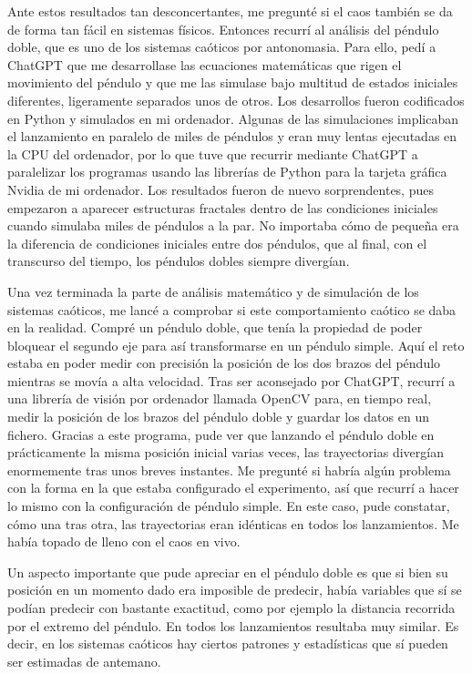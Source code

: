 \documentclass[
  10pt,
  a4paper,
  DIV=11,
  numbers=noendperiod,
  open=any]{scrreprt}
\numberwithin{equation}{chapter}
\numberwithin{equation}{section}
\renewcommand{\[}{\begin{equation}}
\renewcommand{\]}{\end{equation}}
\begin{document}
Ante estos resultados tan desconcertantes, me pregunté si el caos
también se da de forma tan fácil en sistemas físicos. Entonces recurrí
al análisis del péndulo doble, que es uno de los sistemas caóticos por
antonomasia. Para ello, pedí a ChatGPT que me desarrollase las
ecuaciones matemáticas que rigen el movimiento del péndulo y que me las
simulase bajo multitud de estados iniciales diferentes, ligeramente
separados unos de otros. Los desarrollos fueron codificados en Python y
simulados en mi ordenador. Algunas de las simulaciones implicaban el
lanzamiento en paralelo de miles de péndulos y eran muy lentas
ejecutadas en la CPU del ordenador, por lo que tuve que recurrir
mediante ChatGPT a paralelizar los programas usando las librerías de
Python para la tarjeta gráfica Nvidia de mi ordenador. Los resultados
fueron de nuevo sorprendentes, pues empezaron a aparecer estructuras
fractales dentro de las condiciones iniciales cuando simulaba miles de
péndulos a la par. No importaba cómo de pequeña era la diferencia de
condiciones iniciales entre dos péndulos, que al final, con el
transcurso del tiempo, los péndulos dobles siempre divergían.

Una vez terminada la parte de análisis matemático y de simulación de los
sistemas caóticos, me lancé a comprobar si este comportamiento caótico
se daba en la realidad. Compré un péndulo doble, que tenía la propiedad
de poder bloquear el segundo eje para así transformarse en un péndulo
simple. Aquí el reto estaba en poder medir con precisión la posición de
los dos brazos del péndulo mientras se movía a alta velocidad. Tras ser
aconsejado por ChatGPT, recurrí a una librería de visión por ordenador
llamada OpenCV para, en tiempo real, medir la posición de los brazos del
péndulo doble y guardar los datos en un fichero. Gracias a este
programa, pude ver que lanzando el péndulo doble en prácticamente la misma
posición inicial varias veces, las trayectorias divergían enormemente tras unos
breves instantes. Me pregunté si habría algún problema con la forma en
la que estaba configurado el experimento, así que recurrí a hacer lo
mismo con la configuración de péndulo simple. En este caso, pude
constatar, cómo una tras otra, las trayectorias eran idénticas en todos
los lanzamientos. Me había topado de lleno con el caos en vivo.

Un aspecto importante que pude apreciar en el péndulo doble es que si
bien su posición en un momento dado era imposible de predecir, había
variables que sí se podían predecir con bastante exactitud, como por
ejemplo la distancia recorrida por el extremo del péndulo. En todos los
lanzamientos resultaba muy similar. Es decir, en los sistemas caóticos
hay ciertos patrones y estadísticas que sí pueden ser estimadas de
antemano.
\end{document}
